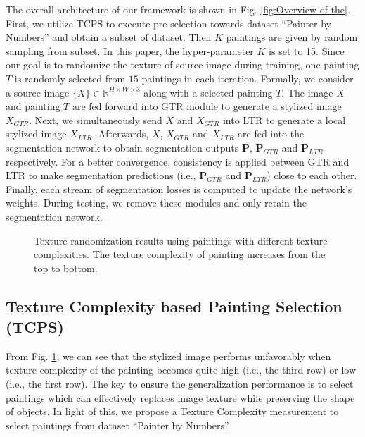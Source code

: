 \documentclass[twocolumn,journal,vlined,ruled,linesnumbered]{IEEEtran}
\begin{document}
The overall architecture of our framework is shown in Fig. \ref{fig:Overview-of-the}. First, we utilize TCPS to execute pre-selection towards dataset ``Painter by Numbers\textquotedblright{} and obtain a subset of dataset. Then $K$ paintings are given by random sampling from subset. In this paper, the hyper-parameter $K$ is set to 15. Since our goal is to randomize the texture of source image during training, one painting $T$ is randomly selected from $15$ paintings in each iteration. Formally, we consider a source image $\{X\}\in\mathbb{R}^{H\times W\times3}$ along with a selected painting $T$. The image $X$ and painting $T$ are fed forward into GTR module to generate a stylized image $X_{GTR}$. Next, we simultaneously send $X$ and $X_{GTR}$ into LTR to generate a local stylized image $X_{LTR}$. Afterwards, $X$, $X_{GTR}$ and $X_{LTR}$ are fed into the segmentation network to obtain segmentation outputs\textbf{ $\mathbf{P}$}, $\mathbf{P}_{GTR}$ and $\mathbf{P}_{LTR}$ respectively. For a better convergence, consistency is applied between GTR and LTR to make segmentation predictions (i.e., $\mathbf{P}_{GTR}$ and $\mathbf{P}_{LTR}$) close to each other. Finally, each stream of segmentation losses is computed to update the network's weights. During testing, we remove these modules and only retain the segmentation network. 

\begin{figure}[t]
\begin{centering}
\centering{}\centering {}
\par\end{centering}
\vspace{-4mm}
\caption{Texture randomization results using paintings with different texture complexities. The texture complexity of painting increases from the top to bottom. \label{fig:The-motivation-for-TAM}}
\vspace{-4mm}
\end{figure}


\subsection{Texture Complexity based Painting Selection (TCPS)}

From Fig. \ref{fig:The-motivation-for-TAM}, we can see that the stylized image performs unfavorably when texture complexity of the painting becomes quite high (i.e., the third row) or low (i.e., the first row). The key to ensure the generalization performance is to select paintings which can effectively replaces image texture while preserving the shape of objects. In light of this, we propose a Texture Complexity measurement to select paintings from dataset ``Painter by Numbers\textquotedblright .
\end{document}
